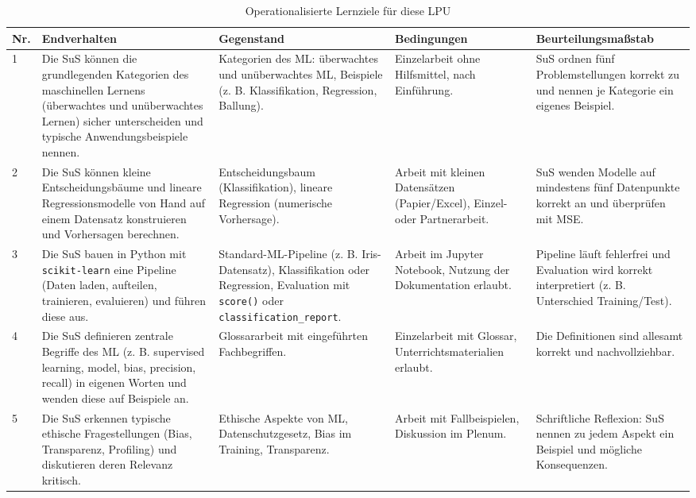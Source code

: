 \documentclass[twocolumn]{article}
\begin{document}
\begin{table}[ht]
\centering
\begin{tabular}{p{1.2cm}p{3.5cm}p{3.5cm}p{3.5cm}p{3.5cm}}
\hline
\textbf{Nr.} & \textbf{Endverhalten} & \textbf{Gegenstand} & \textbf{Bedingungen} & \textbf{Beurteilungs\-maßstab} \\
\hline

1 & Die SuS können die grundlegenden Kategorien des maschinellen Lernens (überwachtes und unüberwachtes Lernen) sicher unterscheiden und typische Anwendungsbeispiele nennen. 
& Kategorien des ML: überwachtes und unüberwachtes ML, Beispiele (z. B. Klassifikation, Regression, Ballung). 
& Einzelarbeit ohne Hilfsmittel, nach Einführung. 
& SuS ordnen fünf Problemstellungen korrekt zu und nennen je Kategorie ein eigenes Beispiel. \\

\hline

2 & Die SuS können kleine Entscheidungsbäume und lineare Regressionsmodelle von Hand auf einem Datensatz konstruieren und Vorhersagen berechnen. 
& Entscheidungsbaum (Klassifikation), lineare Regression (numerische Vorhersage). 
& Arbeit mit kleinen Datensätzen (Papier/Excel), Einzel- oder Partnerarbeit. 
& SuS wenden Modelle auf mindestens fünf Datenpunkte korrekt an und überprüfen mit MSE. \\

\hline

3 & Die SuS bauen in Python mit \texttt{scikit-learn} eine Pipeline (Daten laden, aufteilen, trainieren, evaluieren) und führen diese aus. 
& Standard-ML-Pipeline (z. B. Iris-Datensatz), Klassifikation oder Regression, Evaluation mit \texttt{score()} oder \texttt{classification\_report}. 
& Arbeit im Jupyter Notebook, Nutzung der Dokumentation erlaubt. 
& Pipeline läuft fehlerfrei und Evaluation wird korrekt interpretiert (z. B. Unterschied Training/Test). \\

\hline

4 & Die SuS definieren zentrale Begriffe des ML (z. B. supervised learning, model, bias, precision, recall) in eigenen Worten und wenden diese auf Beispiele an. 
& Glossararbeit mit eingeführten Fachbegriffen. 
& Einzelarbeit mit Glossar, Unterrichtsmaterialien erlaubt. 
& Die Definitionen sind allesamt korrekt und nachvollziehbar. \\

\hline

5 & Die SuS erkennen typische ethische Fragestellungen (Bias, Transparenz, Profiling) und diskutieren deren Relevanz kritisch. 
& Ethische Aspekte von ML, Datenschutzgesetz, Bias im Training, Transparenz. 
& Arbeit mit Fallbeispielen, Diskussion im Plenum. 
& Schriftliche Reflexion: SuS nennen zu jedem Aspekt ein Beispiel und mögliche Konsequenzen. \\

\hline
\end{tabular}
\caption{Operationalisierte Lernziele für diese LPU}
\label{tab:lernziele}
\end{table}
\end{document}
